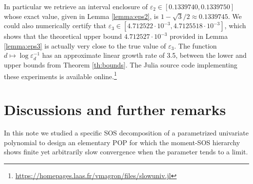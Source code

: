 \documentclass[a4paper,12pt]{article}
\begin{document}
{\begin{figure}[H]
\end{figure}
%
In particular we retrieve an interval enclosure  of $\varepsilon_2 \in [0.1339740, 0.1339750]$ whose exact value, given in Lemma \ref{lemma:eps2}, is $1 - \sqrt{3}/2 \approx 0.1339745$.
We could also numerically certify that $\varepsilon_3 \in [4.712522 \cdot 10^{-3}, 4.7125518 \cdot 10^{-3}]$, which shows that the theoretical upper bound $4.712527\cdot 10^{-3}$ provided in Lemma \ref{lemma:eps3} is actually very close to the true value of $\varepsilon_3$. 
The function $d \mapsto \log \varepsilon_d^{-1}$ has an approximate linear growth rate of 3.5, between the lower and upper bounds from Theorem \ref{th:bounds}. 
The Julia source code implementing these experiments is available online.\footnote{\url{https://homepages.laas.fr/vmagron/files/slowuniv.jl}}
}
{\section{Discussions and further remarks}}
%
In this note we studied a specific SOS decomposition of a parametrized univariate polynomial to design an elementary POP for which the moment-SOS hierarchy shows finite yet arbitrarily slow convergence when the parameter tends to a limit.
\end{document}
